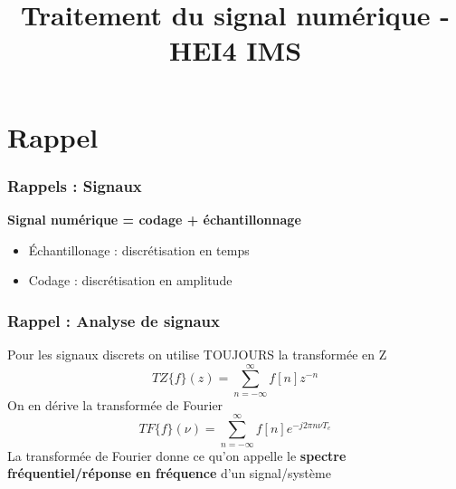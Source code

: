 \documentclass{beamer}
\title[Traitement du signal numérique]{Traitement du signal numérique - HEI4 IMS}
\author[Antony Bazir]{}
\begin{document}
\section{Rappel}
\begin{frame}
\frametitle{Rappels : Signaux }
\textbf{Signal numérique =  codage + échantillonnage}
\begin{center}
\end{center}
\vspace{0.5cm}
\begin{itemize}
\item \'Echantillonage : discrétisation en temps
\vspace{0.3cm}
\item Codage : discrétisation en amplitude
\end{itemize}
\end{frame}

\begin{frame}
\frametitle{Rappel : Analyse de signaux}
Pour les signaux discrets on utilise TOUJOURS la transformée en Z
\[\boxed{TZ\{ f \}(z) = \sum_{n = -\infty}^{\infty} f[n] z^{-n}} \]
On en dérive la transformée de Fourier 
\[\boxed{TF\{ f \}(\nu) = \sum_{n = -\infty}^{\infty} f[n] e^{-j 2 \pi n \nu T_e}} \]
\vspace{0.2cm}
La transformée de Fourier donne ce qu'on appelle le \textbf{spectre fréquentiel/réponse en fréquence} d'un signal/système
\end{frame}
\end{document}

